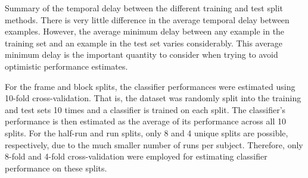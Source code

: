 \documentclass[preprint,5p,authoryear]{elsarticle}
\begin{document}
\begin{table}
\centering

\caption{Summary of the temporal delay between the different training and test split methods.
There is very little difference in the average temporal delay between examples.
However, the average minimum delay between any example in the training set and an example in the test set varies considerably.
This average minimum delay is the important quantity to consider when trying to avoid optimistic performance estimates.}
\label{tab:training-split}
\end{table}

For the frame and block splits, the classifier performances were estimated using 10-fold cross-validation.
That is, the dataset was randomly split into the training and test sets 10 times and a classifier is trained on each split.
The classifier's performance is then estimated as the average of its performance across all 10 splits.
For the half-run and run splits, only 8 and 4 unique splits are possible, respectively, due to the much smaller number of runs per subject. 
Therefore, only 8-fold and 4-fold cross-validation were employed for estimating classifier performance on these splits.


\end{document}
